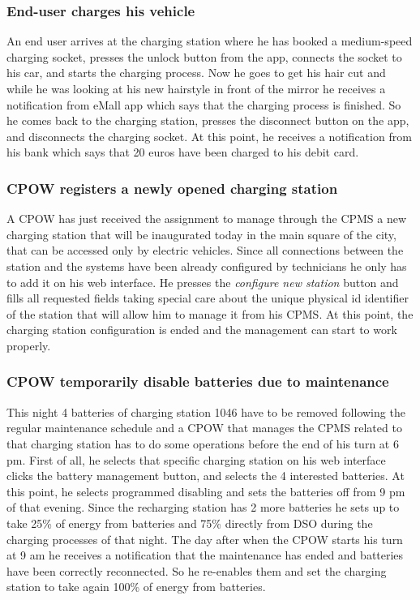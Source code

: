 \documentclass[a4paper]{report}
\begin{document}
\subsubsection{End-user charges his vehicle}
An end user arrives at the charging station where he has booked a medium-speed charging socket, presses the unlock button from the app, connects the socket to his car, and starts the charging process. Now he goes to get his hair cut and while he was looking at his new hairstyle in front of the mirror he receives a notification from eMall app which says that the charging process is finished. So he comes back to the charging station, presses the disconnect button on the app, and disconnects the charging socket. At this point, he receives a notification from his bank which says that 20 euros have been charged to his debit card.

\subsubsection{CPOW registers a newly opened charging station}
A CPOW has just received the assignment to manage through the CPMS a new charging station that will be inaugurated today in the main square of the city, that can be accessed only by electric vehicles. Since all connections between the station and the systems have been already configured by technicians he only has to add it on his web interface. He presses the \textit{configure new station} button and fills all requested fields taking special care about the unique physical id identifier of the station that will allow him to manage it from his CPMS. At this point, the charging station configuration is ended and the management can start to work properly.

\subsubsection{CPOW temporarily disable batteries due to maintenance}
This night 4 batteries of charging station 1046 have to be removed following the regular maintenance schedule and a CPOW that manages the CPMS related to that charging station has to do some operations before the end of his turn at 6 pm. First of all, he selects that specific charging station on his web interface clicks the battery management button, and selects the 4 interested batteries. At this point, he selects programmed disabling and sets the batteries off from 9 pm of that evening. Since the recharging station has 2 more batteries he sets up to take 25\% of energy from batteries and 75\% directly from DSO during the charging processes of that night. The day after when the CPOW starts his turn at 9 am he receives a notification that the maintenance has ended and batteries have been correctly reconnected. So he re-enables them and set the charging station to take again 100\% of energy from batteries.
\end{document}
